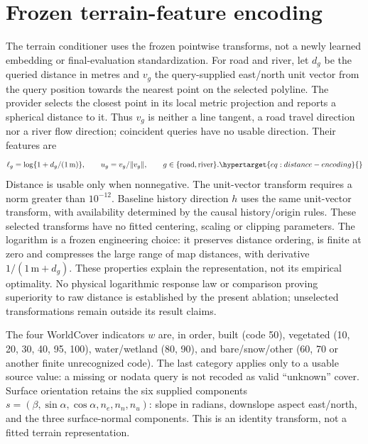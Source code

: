 \section{Frozen terrain-feature encoding}
\label{sec:feature-encoding}\hypertarget{sec:feature-encoding}{}
The terrain conditioner uses the frozen pointwise transforms,
not a newly learned embedding or final-evaluation standardization. For road
and river, let \(d_g\) be the queried distance in metres and \(v_g\) the
query-supplied east/north unit vector from the query position towards the
nearest point on the selected polyline. The provider selects the closest
point in its local metric projection and reports a spherical distance to it.
Thus \(v_g\) is neither a line tangent, a road travel direction nor a river
flow direction; coincident queries have no usable direction. Their features are
\begin{equation}
 \ell_g=\log\{1+d_g/(1\,\mathrm{m})\},\qquad
 u_g=v_g/\|v_g\|,\qquad g\in\{\mathrm{road},\mathrm{river}\}.
 \label{eq:distance-encoding}\hypertarget{eq:distance-encoding}{}
\end{equation}
Distance is usable only when nonnegative. The unit-vector transform requires
a norm greater than \(10^{-12}\). Baseline history direction \(h\) uses the
same unit-vector transform, with availability determined by the causal
history/origin rules. These selected transforms have no fitted centering,
scaling or clipping parameters. The logarithm is a frozen engineering choice:
it preserves distance ordering, is finite at zero and compresses the large
range of map distances, with derivative \(1/(1\,\mathrm m+d_g)\).
These properties explain the representation, not its empirical optimality.
No physical logarithmic response law or comparison proving superiority to raw
distance is established by the present ablation; unselected transformations
remain outside its result claims.

The four WorldCover indicators \(w\) are, in order, built (code 50), vegetated
(10, 20, 30, 40, 95, 100), water/wetland (80, 90), and bare/snow/other (60, 70
or another finite unrecognized code). The last category applies only to a
usable source value: a missing or nodata query is not recoded as valid
``unknown'' cover. Surface orientation retains the six supplied components
\(s=(\beta,\sin\alpha,\cos\alpha,n_e,n_n,n_u)\): slope in radians, downslope
aspect east/north, and the three surface-normal components. This is an
identity transform, not a fitted terrain representation.

